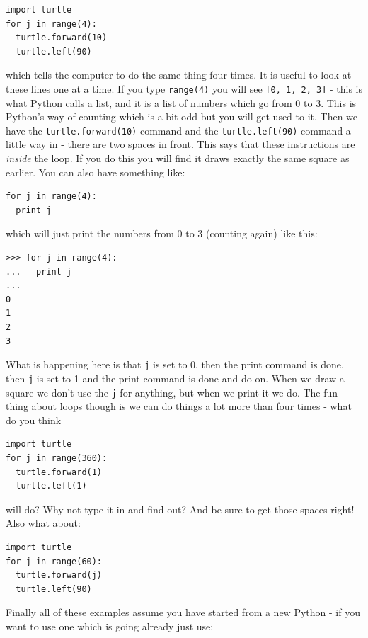 \documentclass[a4paper, 11pt]{book}
\begin{document}
{\small
\begin{verbatim}
import turtle
for j in range(4):
  turtle.forward(10)
  turtle.left(90)
\end{verbatim}
}

\noindent 
which tells the computer to do the same thing four times. It is useful to look at these lines one at a time. If you type \verb|range(4)| you will see \verb|[0, 1, 2, 3]| - this is what Python calls a list, and it is a list of numbers which go from 0 to 3. This is Python's way of counting which is a bit odd but you will get used to it. Then we have the \verb|turtle.forward(10)| command and the \verb|turtle.left(90)| command a little way in - there are two spaces in front. This says that these instructions are \emph{inside} the loop. If you do this you will find it draws exactly the same square as earlier. You can also have something like:

{\small
\begin{verbatim}
for j in range(4):
  print j
\end{verbatim}
}

\noindent 
which will just print the numbers from 0 to 3 (counting again) like this:

{\small
\begin{verbatim}
>>> for j in range(4):
...   print j
... 
0
1
2
3
\end{verbatim}
}

\noindent
What is happening here is that \verb|j| is set to 0, then the print command is done, then \verb|j| is set to 1 and the print command is done and do on. When we draw a square we don't use the \verb|j| for anything, but when we print it we do. The fun thing about loops though is we can do things a lot more than four times - what do you think

{\small
\begin{verbatim}
import turtle
for j in range(360):
  turtle.forward(1)
  turtle.left(1)
\end{verbatim}
}

\noindent
will do? Why not type it in and find out? And be sure to get those
spaces right! Also what about:

{\small
\begin{verbatim}
import turtle
for j in range(60):
  turtle.forward(j)
  turtle.left(90)
\end{verbatim}
}

Finally all of these examples assume you have started from a new
Python - if you want to use one which is going already just use:
\end{document}
